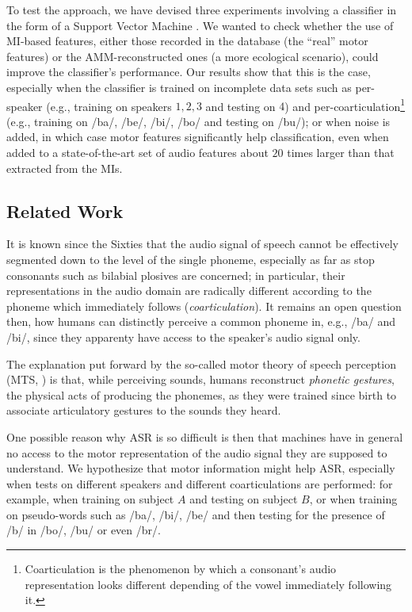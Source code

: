To test the approach, we have devised three experiments involving a 
classifier in the form of a Support Vector Machine \cite{BGV92}. We wanted to check whether
the use of MI-based features, either those recorded in the database (the ``real''
motor features) or the AMM-reconstructed ones (a more ecological scenario),
could improve the classifier's performance. Our results show that this is the case,
especially when the classifier is trained on incomplete data sets such as 
per-speaker (e.g., training on speakers $1,2,3$ and testing on $4$) and
per-coarticulation\footnote{Coarticulation is the phenomenon by which a consonant's audio representation
looks different depending of the vowel immediately following it.}
(e.g., training on /ba/, /be/, /bi/, /bo/ and testing on /bu/); or when noise is added,
in which case motor features significantly help classification, even when added to a
state-of-the-art set of audio features about $20$ times larger than that extracted
from the MIs.

\subsection{Related Work}

It is known since the Sixties \cite{liberman1} that the audio signal of speech
cannot be effectively segmented down to the level of the single phoneme,
especially as far as stop consonants such as bilabial plosives
are concerned; in particular, their representations in the audio domain are
radically different according to the phoneme which immediately follows
(\emph{coarticulation}). It remains an open question then, how humans can
distinctly perceive a common phoneme in, e.g., /ba/ and /bi/, since they
apparenty have access to the speaker's audio signal only.

The explanation put forward by the so-called motor theory of speech perception
(MTS, \cite{liberman2,galant,massaro}) is that, while perceiving sounds,
humans reconstruct \emph{phonetic gestures}, the physical acts of
producing the phonemes, as they were trained since birth to associate
articulatory gestures to the sounds they heard. 

One possible reason why ASR is so difficult is then that
machines have in general no access to the motor representation of the
audio signal they are supposed to understand. We hypothesize that motor 
information might help ASR, especially when tests on different speakers and different
coarticulations are performed: for example, when training on subject $A$ and
testing on subject $B$, or when training on pseudo-words such as /ba/, /bi/,
/be/ and then testing for the presence of /b/ in /bo/, /bu/ or even /br/.

